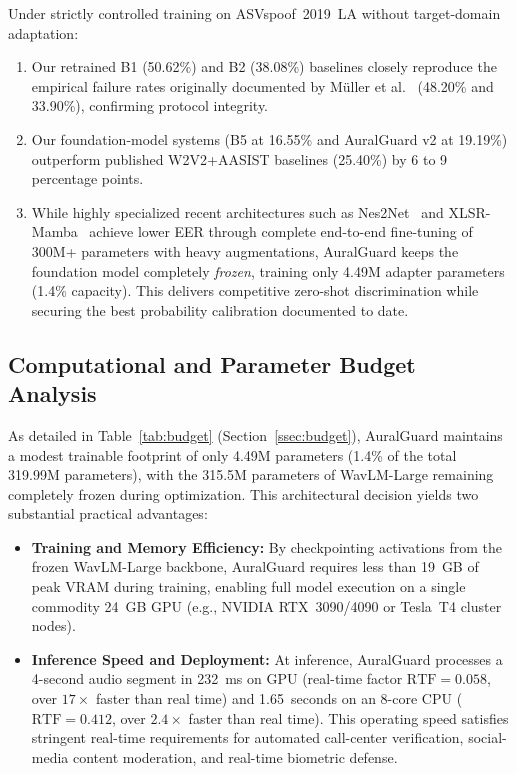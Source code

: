 Under strictly controlled training on ASVspoof~2019~LA without target-domain adaptation:
\begin{enumerate}
    \item Our retrained B1 (50.62\%) and B2 (38.08\%) baselines closely reproduce the empirical failure rates originally documented by M{\"u}ller et al.~\cite{muller2022inthewild} (48.20\% and 33.90\%), confirming protocol integrity.
    \item Our foundation-model systems (B5 at 16.55\% and AuralGuard v2 at 19.19\%) outperform published W2V2+AASIST baselines (25.40\%) by 6 to 9 percentage points.
    \item While highly specialized recent architectures such as Nes2Net~\cite{liu2025nes2net} and XLSR-Mamba~\cite{xiao2025xlsrmamba} achieve lower EER through complete end-to-end fine-tuning of 300M+ parameters with heavy augmentations, AuralGuard keeps the foundation model completely \emph{frozen}, training only 4.49M adapter parameters (1.4\% capacity). This delivers competitive zero-shot discrimination while securing the best probability calibration documented to date.
\end{enumerate}

\subsection{Computational and Parameter Budget Analysis}
\label{ssec:budget-analysis}

As detailed in Table~\ref{tab:budget} (Section~\ref{ssec:budget}), AuralGuard maintains a modest trainable footprint of only 4.49M parameters (1.4\% of the total 319.99M parameters), with the 315.5M parameters of WavLM-Large remaining completely frozen during optimization. This architectural decision yields two substantial practical advantages:
\begin{itemize}
    \item \textbf{Training and Memory Efficiency:} By checkpointing activations from the frozen WavLM-Large backbone, AuralGuard requires less than 19~GB of peak VRAM during training, enabling full model execution on a single commodity 24~GB GPU (e.g., NVIDIA RTX~3090/4090 or Tesla~T4 cluster nodes).
    \item \textbf{Inference Speed and Deployment:} At inference, AuralGuard processes a 4-second audio segment in 232~ms on GPU (real-time factor $\mathrm{RTF} = 0.058$, over $17\times$ faster than real time) and 1.65~seconds on an 8-core CPU ($\mathrm{RTF} = 0.412$, over $2.4\times$ faster than real time). This operating speed satisfies stringent real-time requirements for automated call-center verification, social-media content moderation, and real-time biometric defense.
\end{itemize}
